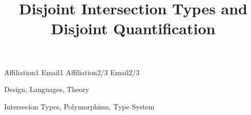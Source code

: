 \documentclass[nocopyrightspace,preprint,times,9pt]{sigplanconf}
\begin{document}
\setlength{\pdfpageheight}{\paperheight}
\setlength{\pdfpagewidth}{\paperwidth}


\preprintfooter{\name}                        %

\title{Disjoint Intersection Types and Disjoint Quantification}

           {Affiliation1}
           {Email1}
           {Affiliation2/3}
           {Email2/3}

\maketitle

\begin{abstract}
  
\end{abstract}


\terms Design, Languages, Theory

\keywords Intersecion Types, Polymorphism, Type System













\clearpage
\onecolumn

\appendix


\end{document}
